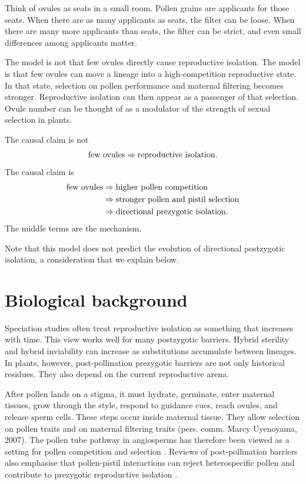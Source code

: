 \documentclass[12pt]{article}
\begin{document}
\begin{metaphorbox}
Think of ovules as seats in a small room. Pollen grains are applicants for those seats. When there are as many applicants as seats, the filter can be loose. When there are many more applicants than seats, the filter can be strict, and even small differences among applicants matter.
\end{metaphorbox}

The model is not that few ovules directly cause reproductive isolation. The model is that few ovules can move a lineage into a high-competition reproductive state. In that state, selection on pollen performance and maternal filtering becomes stronger. Reproductive isolation can then appear as a passenger of that selection. Ovule number can be thought of as a modulator of the strength of sexual selection in plants. 

\begin{conclusionbox}
The causal claim is not
\[
\hbox{few ovules} \Rightarrow \hbox{reproductive isolation}.
\]
The causal claim is
\begin{align*}
\hbox{few ovules}
&\Rightarrow \hbox{higher pollen competition}\\
&\Rightarrow \hbox{stronger pollen and pistil selection}\\
&\Rightarrow \hbox{directional prezygotic isolation}.
\end{align*}
The middle terms are the mechanism.
\end{conclusionbox}

Note that this model does not predict the evolution of directional postzygotic isolation, a consideration that we explain below. 

\section{Biological background}

Speciation studies often treat reproductive isolation as something that increases with time. This view works well for many postzygotic barriers. Hybrid sterility and hybrid inviability can increase as substitutions accumulate between lineages. In plants, however, post-pollination prezygotic barriers are not only historical residues. They also depend on the current reproductive arena.

After pollen lands on a stigma, it must hydrate, germinate, enter maternal tissues, grow through the style, respond to guidance cues, reach ovules, and release sperm cells. These steps occur inside maternal tissue. They allow selection on pollen traits and on maternal filtering traits (pers. comm. Marcy Uyenoyama, 2007). The pollen tube pathway in angiosperms has therefore been viewed as a setting for pollen competition and selection \citep{Lora2016,LankinenGreen2015}. Reviews of post-pollination barriers also emphasise that pollen-pistil interactions can reject heterospecific pollen and contribute to prezygotic reproductive isolation \citep{WangFilatov2023}.
\end{document}
